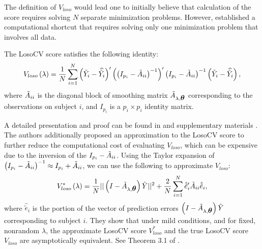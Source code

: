 \bigskip

The definition of $V_{loso}$ would lead one to initially believe that calculation of the score requires solving $N$ separate minimization problems. However, \cite{xu2012asymptotic} established a computational shortcut that requires solving only one minimization problem that involves all data. 
  
  \begin{lemma} \label{lemma:losocv-shortcut}
  The LosoCV score satisfies the following identity:
  \begin{equation*}
 V_{loso}\left( \lambda \right) = \frac{1}{N} \sum_{i = 1}^N \left(\tilde{Y}_i - \widehat{\tilde{Y}_i}\right)' \left(\left(I_{p_i} - \tilde{A}_{ii}\right)^{-1}\right)'\left(I_{p_i} - \tilde{A}_{ii}\right)^{-1}\left(\tilde{Y}_i - \widehat{\tilde{Y}_i}\right),
  \end{equation*}
  \noindent
  where $\tilde{A}_{ii}$ is the diagonal block of smoothing matrix $\tilde{A}_{\lambda,\mbox{\boldmath $\theta$}}$ corresponding to the observations on subject $i$, and $I_{p_i}$ is a $p_i \times p_i$ identity matrix.
\end{lemma}

A detailed presentation and proof can be found in \cite{xu2012asymptotic} and supplementary materials \cite{xuasymptotic}.  The authors additionally proposed an approximation to the LosoCV score to further reduce the computational cost of evaluating $V_{loso}$, which can be expensive due to the inversion of the $I_{p_i} - \tilde{A}_{ii}$. Using the Taylor expansion of $\left(I_{p_i} - \tilde{A}_{ii}\right)^{-1} \approx I_{p_i} + \tilde{A}_{ii}$, we can use the following to approximate $V_{loso}$:
\begin{equation} \label{eq:approx-losocv}
V_{loso}^*\left( \lambda \right) = \frac{1}{N} \vert \vert \left(I - \tilde{A}_{\lambda,\mbox{\boldmath $\theta$}}\right)\tilde{Y} \vert \vert^2 + \frac{2}{N} \sum_{i = 1}^N \hat{\tilde{e}}'_{i}\tilde{A}_{ii}\hat{\tilde{e}}_i,
\end{equation}
\noindent
where $\hat{\tilde{e}}_i$ is the portion of the vector of prediction errors $\left(I - \tilde{A}_{\lambda,\mbox{\boldmath $\theta$}}\right)\tilde{Y}$ corresponding to subject $i$. They show that under mild conditions, and for fixed, nonrandom $\lambda$, the approximate LosoCV score $V_{loso}^*$ and the true LosoCV score $V_{loso}$ are asymptotically equivalent. See Theorem 3.1 of \cite{xu2012asymptotic}.
  

